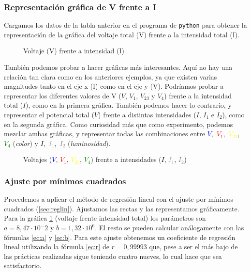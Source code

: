 \documentclass[12pt, a4paper, titlepage]{article}
\newcommand{\code}[1]{\texttt{#1}} %
\begin{document}
  \subsubsection{Representación gráfica de V frente a I}

  Cargamos los datos de la tabla anterior en el programa de \code{python} para obtener la representación de la gráfica del voltaje total (V) frente a la intensidad total (I).

  \begin{figure}[H]
    \hspace{2.5em} 
    \caption{Voltaje (V) frente a intensidad (I)}
    \label{graf:cmixinttotal}
  \end{figure}

  También podemos probar a hacer gráficas más interesantes. Aquí no hay una relación tan clara como en los anteriores ejemplos, ya que existen varias magnitudes tanto en el eje x (I) como en el eje y (V). Podríamos probar a representar los diferentes valores de V ($V$, $V_1$, $V_{23}$ y $V_4$) frente a la intensidad total ($I$), como en la primera gráfica. También podemos hacer lo contrario, y representar el potencial total ($V$) frente a distintas intensidades ($I$, $I_1$ e $I_2$), como en la segunda gráfica. Como curiosidad más que como experimento, podemos mezclar ambas gráficas, y representar todas las combinaciones entre \textcolor{Blue}{$V$},~\textcolor{Red}{$V_1$},~\textcolor{Yellow}{$V_{23}$},~\textcolor{Green}{$V_4$} (\textit{color}) y \textcolor{Black}{$I$},~\textcolor{DarkGrey}{$I_1$},~\textcolor{Grey}{$I_2$} (\textit{luminosidad}).

  \begin{figure}[H]
    \centering
    
    
    
    \caption{Voltajes (\textcolor{Blue}{$V$}, \textcolor{Red}{$V_1$}, \textcolor{Yellow}{$V_{23}$}, \textcolor{Green}{$V_4$}) frente a intensidades (\textcolor{Black}{$I$}, \textcolor{DarkGrey}{$I_1$}, \textcolor{Grey}{$I_2$})}
    \label{graf:cmixmulti}
  \end{figure}

  \subsubsection{Ajuste por mínimos cuadrados}
  \label{v:mixto}

  Procedemos a aplicar el método de regresión lineal con el ajuste por mínimos cuadrados (\ref{sec:reglin}). Ajustamos las rectas y las representamos gráficamente. Para la gráfica \ref{graf:cmixinttotal} (voltaje frente intensidad total) los parámetros son $a = 8,47 \cdot 10^-2$ y $b = 1,32 \cdot 10^6$. El resto se pueden calcular análogamente con las fórmulas \ref{ec:a} y \ref{ec:b}. Para este ajuste obtenemos un coeficiente de regresión lineal utilizando la fórmula \ref{ec:r} de $r = 0,99993$ que, pese a ser el más bajo de las prácticas realizadas sigue teniendo cuatro nueves, lo cual hace que sea satisfactorio.
\end{document}
